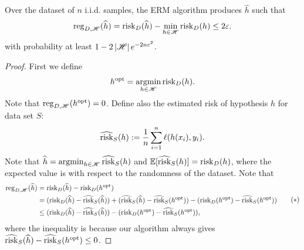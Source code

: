 \documentclass[a4paper]{article}
\begin{document}
\begin{thm}
  Over the dataset of $n$ i.i.d. samples, the ERM algorithm
  produces $\hat{h}$ such that 
  \[
  \operatorname{reg}_{D, \mathscr{H}} (\widehat{h}) 
  = \operatorname{risk}_D (\widehat{h}) - \min_{h \in \mathscr{H}} 
  \operatorname{risk}_D (h) 
  \leq 2 \varepsilon.
  \]
  with probability at least $1 - 2 \left\lvert \mathscr{H}\right\rvert e^{- 2
  n \varepsilon^2}$.
\end{thm}

\begin{proof}
{
  \newcommand{\hopt}{h^{\text{opt}}}
  First we define
  \[
    \hopt = \argmin_{h \in \scrh} \risk_D (h).
  \]
  Note that $\reg_{D, \scrh}(\hopt) = 0$. Define also the 
  estimated risk of hypothesis $h$ for data set $S$:
  \[
  \widehat{\operatorname{risk}}_S (h) := \frac{1}{n} \sum_{i=1}^n \ell(h(x_i),
  y_i).
  \]
  Note that $\widehat{h} = \operatorname*{argmin}_{h \in \mathscr{H}} 
  \widehat{\operatorname{risk}}_S (h)$ and $\mathbb{E}[\widehat{\operatorname{risk}}_S (h)] = 
  \operatorname{risk}_D(h)$, where the expected value is with respect to 
  the randomness of the dataset. Note that 
  \begin{equation*}
    \begin{aligned}
      \reg_{D, \scrh} (\hat{h}) 
      &= \risk_D (\hat{h}) - \risk_D (\hopt) \\
      &= (\risk_D (\hat{h}) - \hat{\risk}_S (\hat{h}))
      + (\hat{\risk}_S (\hat{h}) - \hat{\risk}_S (\hopt)) 
      - (\risk_D (\hopt) - \hat{\risk}_S (\hopt))  \\
      &\leq (\risk_D (\hat{h}) - \hat{\risk}_S (\hat{h}))
      - (\risk_D (\hopt) - \hat{\risk}_S (\hopt)),
    \end{aligned}
    \tag{$*$}
    \label{reg}
  \end{equation*}
  where the inequality is because our algorithm
  always gives
  $\hat{\risk}_S (\hat{h}) - \hat{\risk}_S (\hopt) \leq 0$.

}
\end{proof}
\end{document}
